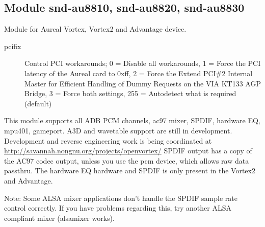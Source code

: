\documentclass[a4paper,8pt,english]{sphinxmanual}
\begin{document}
\subsection{Module snd-au8810, snd-au8820, snd-au8830}
\label{sound/alsa-configuration:module-snd-au8810-snd-au8820-snd-au8830}
Module for Aureal Vortex, Vortex2 and Advantage device.
\begin{description}
\item[{pcifix}] \leavevmode
Control PCI workarounds;
0 = Disable all workarounds,
1 = Force the PCI latency of the Aureal card to 0xff,
2 = Force the Extend PCI\#2 Internal Master for Efficient
Handling of Dummy Requests on the VIA KT133 AGP Bridge,
3 = Force both settings,
255 = Autodetect what is required (default)

\end{description}

This module supports all ADB PCM channels, ac97 mixer, SPDIF, hardware
EQ, mpu401, gameport. A3D and wavetable support are still in development.
Development and reverse engineering work is being coordinated at
\href{http://savannah.nongnu.org/projects/openvortex/}{http://savannah.nongnu.org/projects/openvortex/}
SPDIF output has a copy of the AC97 codec output, unless you use the
 pcm device, which allows raw data passthru.
The hardware EQ hardware and SPDIF is only present in the Vortex2 and
Advantage.

Note: Some ALSA mixer applications don't handle the SPDIF sample rate
control correctly. If you have problems regarding this, try
another ALSA compliant mixer (alsamixer works).
\end{document}
